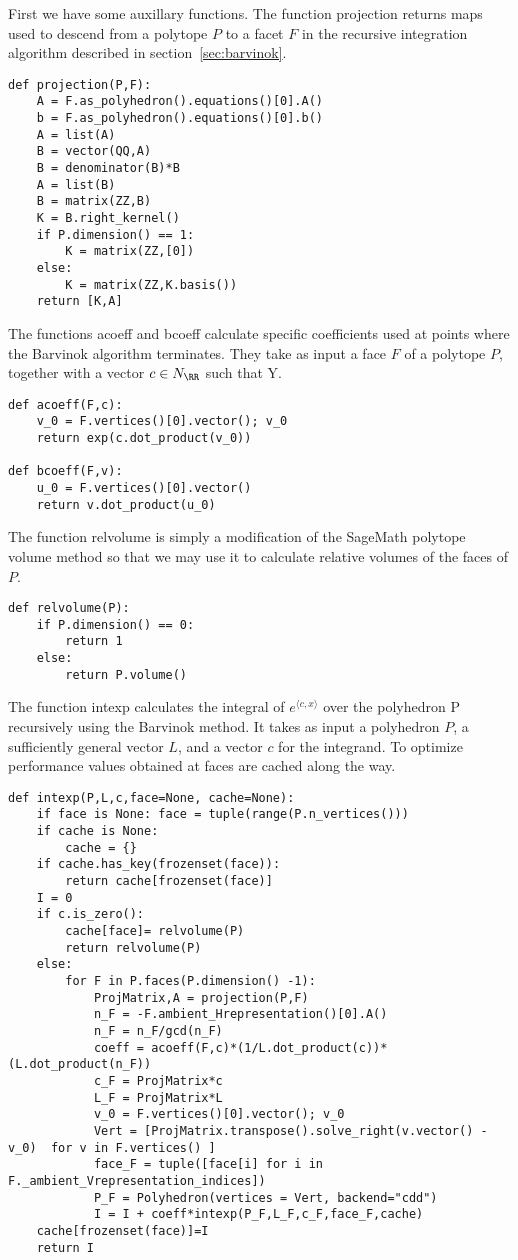 First we have some auxillary functions. The function projection returns maps used to descend from a polytope \(P\) to a facet \(F\) in the recursive integration algorithm described in section~\ref{sec:barvinok}.
\begin{lstlisting}
def projection(P,F):
    A = F.as_polyhedron().equations()[0].A()
    b = F.as_polyhedron().equations()[0].b()
    A = list(A)
    B = vector(QQ,A)
    B = denominator(B)*B
    A = list(B)
    B = matrix(ZZ,B)
    K = B.right_kernel()
    if P.dimension() == 1:
        K = matrix(ZZ,[0])
    else:
        K = matrix(ZZ,K.basis())
    return [K,A]
\end{lstlisting}
The functions acoeff and bcoeff calculate specific coefficients used at points where the Barvinok algorithm terminates. They take as input a face \(F\) of a polytope \(P\), together with a vector \(c \in N_\RR\) such that Y.
\begin{lstlisting}
def acoeff(F,c):
    v_0 = F.vertices()[0].vector(); v_0
    return exp(c.dot_product(v_0))

def bcoeff(F,v):
    u_0 = F.vertices()[0].vector()
    return v.dot_product(u_0)
\end{lstlisting}
The function relvolume is simply a modification of the SageMath polytope volume method so that we may use it to calculate relative volumes of the faces of \(P\).
\begin{lstlisting}
def relvolume(P):
    if P.dimension() == 0:
        return 1
    else:
        return P.volume()
\end{lstlisting}
The function intexp calculates the integral of \(e^{\langle c, x \rangle}\) over the polyhedron P recursively using the Barvinok method. It takes as input a polyhedron \(P\), a sufficiently general vector \(L\), and a vector \(c\) for the integrand. To optimize performance values obtained at faces are cached along the way.
\begin{lstlisting}
def intexp(P,L,c,face=None, cache=None):
    if face is None: face = tuple(range(P.n_vertices()))
    if cache is None:
        cache = {}
    if cache.has_key(frozenset(face)):
        return cache[frozenset(face)]
    I = 0
    if c.is_zero():
        cache[face]= relvolume(P)
        return relvolume(P)
    else:
        for F in P.faces(P.dimension() -1):
            ProjMatrix,A = projection(P,F)
            n_F = -F.ambient_Hrepresentation()[0].A()
            n_F = n_F/gcd(n_F)
            coeff = acoeff(F,c)*(1/L.dot_product(c))*(L.dot_product(n_F))
            c_F = ProjMatrix*c
            L_F = ProjMatrix*L
            v_0 = F.vertices()[0].vector(); v_0
            Vert = [ProjMatrix.transpose().solve_right(v.vector() - v_0)  for v in F.vertices() ]
            face_F = tuple([face[i] for i in F._ambient_Vrepresentation_indices])
            P_F = Polyhedron(vertices = Vert, backend="cdd")
            I = I + coeff*intexp(P_F,L_F,c_F,face_F,cache)
    cache[frozenset(face)]=I
    return I
\end{lstlisting}

